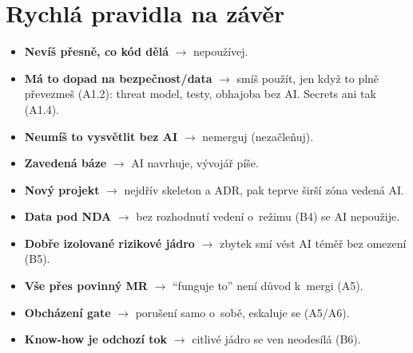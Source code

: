 \section{Rychlá pravidla na závěr}

\begin{itemize}
\item \textbf{Nevíš přesně, co kód dělá} $\rightarrow$ nepoužívej.
\item \textbf{Má to dopad na bezpečnost/data} $\rightarrow$ smíš použít, jen když to plně převezmeš (A1.2): threat model, testy, obhajoba bez AI. Secrets ani tak (A1.4).
\item \textbf{Neumíš to vysvětlit bez AI} $\rightarrow$ nemerguj (nezačleňuj).
\item \textbf{Zavedená báze} $\rightarrow$ AI navrhuje, vývojář píše.
\item \textbf{Nový projekt} $\rightarrow$ nejdřív skeleton a ADR, pak teprve širší zóna vedená AI.
\item \textbf{Data pod NDA} $\rightarrow$ bez rozhodnutí vedení o~režimu (B4) se AI nepoužije.
\item \textbf{Dobře izolované rizikové jádro} $\rightarrow$ zbytek smí vést AI téměř bez omezení (B5).
\item \textbf{Vše přes povinný MR} $\rightarrow$ \enquote{funguje to} není důvod k~mergi (A5).
\item \textbf{Obcházení gate} $\rightarrow$ porušení samo o~sobě, eskaluje se (A5/A6).
\item \textbf{Know-how je odchozí tok} $\rightarrow$ citlivé jádro se ven neodesílá (B6).
\end{itemize}


